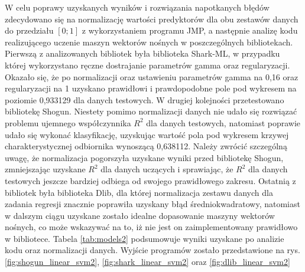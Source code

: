 W celu poprawy uzyskanych wyników i rozwiązania napotkanych błędów zdecydowano się na normalizację wartości predyktorów dla obu zestawów danych do przedziału $[0; 1]$ z wykorzystaniem programu JMP, a następnie analizę kodu realizującego uczenie maszyn wektorów nośnych w poszczególnych bibliotekach. Pierwszą z analizowanych bibliotek była biblioteka Shark-ML, w przypadku której wykorzystano ręczne dostrajanie parametrów gamma oraz regularyzacji. Okazało się, że po normalizacji oraz ustawieniu parametrów gamma na 0,16 oraz regularyzacji na 1 uzyskano prawidłowi i prawdopodobne pole pod wykresem na poziomie 0,933129 dla danych testowych. W drugiej kolejności przetestowano bibliotekę Shogun. Niestety pomimo normalizacji danych nie udało się rozwiązać problemu ujemnego współczynnika $R^2$ dla danych testowych, natomiast poprawie udało się wykonać klasyfikację, uzyskując wartość pola pod wykresem krzywej charakterystycznej odbiornika wynoszącą 0,638112. Należy zwrócić szczególną uwagę, że normalizacja pogorszyła uzyskane wyniki przed bibliotekę Shogun, zmniejszając uzyskane $R^2$ dla danych uczących i sprawiając, że $R^2$ dla danych testowych jeszcze bardziej odbiega od swojego prawidłowego zakresu. Ostatnią z bibliotek była biblioteka Dlib, dla której normalizacja zestawu danych dla zadania regresji znacznie poprawiła uzyskany błąd średniokwadratowy, natomiast w dalszym ciągu uzyskane zostało idealne dopasowanie maszyny wektorów nośnych, co może wskazywać na to, iż nie jest on zaimplementowany prawidłowo w bibliotece. Tabela \ref{tab:models2} podsumowuje wyniki uzyskane po analizie kodu oraz normalizacji danych. Wyjście programów zostało przedstawione na rys. \ref{fig:shogun_linear_svm2}, \ref{fig:shark_linear_svm2} oraz \ref{fig:dlib_linear_svm2}

